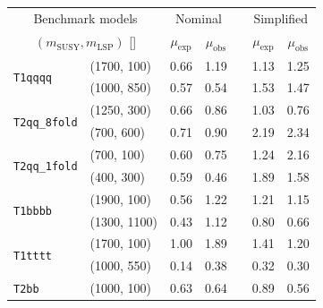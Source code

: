 \begin{table}[!t]
  \label{tab:aggr_limits}
  \centering
  \begin{tabular}{ llccccc }
    \hline
    \multicolumn{2}{c}{Benchmark models}    & \multicolumn{2}{c}{Nominal}
                                            & 
                                            & \multicolumn{2}{c}{Simplified}             \\ [0.3ex]
    \cline{3-4}
    \cline{6-7}
    \multicolumn{2}{c}{$(m_{\text{SUSY}}, m_{\mathrm{LSP}})$ [\GeVns{}]} 
                                            & $\mu_{\text{exp}}$
                                            & $\mu_{\text{obs}}$
                                            & 
                                            & $\mu_{\text{exp}}$
                                            & $\mu_{\text{obs}}$                         \\ [0.3ex]
    \hline
    \multirow{2}{*}{\texttt{T1qqqq}}        & (1700, 100)   & 0.66 & 1.19 &  & 1.13 & 1.25 \\
                                            & (1000, 850)   & 0.57 & 0.54 &  & 1.53 & 1.47 \\ [0.5ex]
    \multirow{2}{*}{\texttt{T2qq\_8fold}}   & (1250, 300)   & 0.66 & 0.86 &  & 1.03 & 0.76 \\
                                            & (700, 600)    & 0.71 & 0.90 &  & 2.19 & 2.34 \\ [0.5ex]
    \multirow{2}{*}{\texttt{T2qq\_1fold}}   & (700, 100)    & 0.60 & 0.75 &  & 1.24 & 2.16 \\
                                            & (400, 300)    & 0.59 & 0.46 &  & 1.89 & 1.58 \\ [0.5ex]
    \multirow{2}{*}{\texttt{T1bbbb}}        & (1900, 100)   & 0.56 & 1.22 &  & 1.21 & 1.15 \\
                                            & (1300, 1100)  & 0.43 & 1.12 &  & 0.80 & 0.66 \\ [0.5ex]
    \multirow{2}{*}{\texttt{T1tttt}}        & (1700, 100)   & 1.00 & 1.89 &  & 1.41 & 1.20 \\
                                            & (1000, 550)   & 0.14 & 0.38 &  & 0.32 & 0.30 \\ [0.5ex]
    \multirow{2}{*}{\texttt{T2bb}}          & (1000, 100)   & 0.63 & 0.64 &  & 0.89 & 0.56 \\

\end{tabular}
\end{table}
